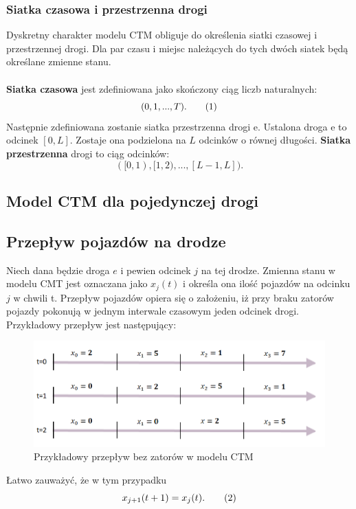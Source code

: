 \documentclass[12pt]{book}
\theoremstyle{plain}
\newcommand\addtag{\refstepcounter{equation}
\renewcommand{\labelenumii}{\theenumii}
\renewcommand{\theenumii}{\theenumi.\arabic{enumii}.}
\tag{\theequation}}
\begin{document}
\subsubsection*{Siatka czasowa i przestrzenna drogi}
Dyskretny charakter modelu CTM obliguje do określenia siatki czasowej i przestrzennej drogi. Dla par czasu i miejsc należących do tych dwóch siatek będą określane zmienne stanu. \\ \\ \textbf{Siatka czasowa} jest zdefiniowana jako skończony ciąg liczb naturalnych:
\[(0,1,...,T). \addtag \]
Następnie zdefiniowana zostanie siatka przestrzenna drogi e. Ustalona droga e to odcinek $[0,L]$. Zostaje ona podzielona na $L$ odcinków o równej długości. \textbf{Siatka przestrzenna} drogi to ciąg odcinków:
\[([0,1),[1,2),...,[L-1,L] ).\]

\subsection{Model CTM dla pojedynczej drogi}
\subsection*{Przepływ pojazdów na drodze}
Niech dana będzie droga $e$ i pewien odcinek $j$ na tej drodze. Zmienna stanu w modelu CMT jest oznaczana jako $x_j(t)$ i określa ona ilość pojazdów na odcinku $j$ w chwili t.
Przepływ pojazdów opiera się o założeniu, iż przy braku zatorów pojazdy pokonują w jednym interwale czasowym jeden odcinek drogi. Przykładowy przepływ jest następujący:
\begin{figure}[H]
	\centering
	\includegraphics[width=14cm]{images/CTM_flow_example}
	\caption{Przykładowy przepływ bez zatorów w modelu CTM}
	\label{fig:CTM_flow_example}
\end{figure} \noindent
Łatwo zauważyć, że w tym przypadku
\[ x_{j+1}(t+1)=x_j(t). \addtag \]
\end{document}
